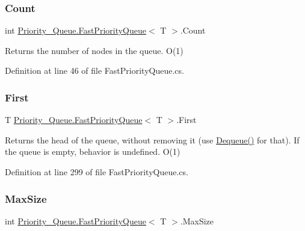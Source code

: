 \subsubsection{\texorpdfstring{Count}{Count}}
{\footnotesize\ttfamily int \hyperlink{class_priority___queue_1_1_fast_priority_queue}{Priority\+\_\+\+Queue.\+Fast\+Priority\+Queue}$<$ T $>$.Count\hspace{0.3cm}{\ttfamily [get]}}



Returns the number of nodes in the queue. O(1) 



Definition at line 46 of file Fast\+Priority\+Queue.\+cs.

\mbox{\label{class_priority___queue_1_1_fast_priority_queue_ada99ea4007e6af6c84660d088bb054fc}} 
\subsubsection{\texorpdfstring{First}{First}}
{\footnotesize\ttfamily T \hyperlink{class_priority___queue_1_1_fast_priority_queue}{Priority\+\_\+\+Queue.\+Fast\+Priority\+Queue}$<$ T $>$.First\hspace{0.3cm}{\ttfamily [get]}}



Returns the head of the queue, without removing it (use \hyperlink{class_priority___queue_1_1_fast_priority_queue_ac1b1d19f0769e01956cdcb1fbd5f08ac}{Dequeue()} for that). If the queue is empty, behavior is undefined. O(1) 



Definition at line 299 of file Fast\+Priority\+Queue.\+cs.

\mbox{\label{class_priority___queue_1_1_fast_priority_queue_a1dc8784035e6432aa2851a5251cb72bf}} 
\subsubsection{\texorpdfstring{Max\+Size}{MaxSize}}
{\footnotesize\ttfamily int \hyperlink{class_priority___queue_1_1_fast_priority_queue}{Priority\+\_\+\+Queue.\+Fast\+Priority\+Queue}$<$ T $>$.Max\+Size\hspace{0.3cm}{\ttfamily [get]}}



